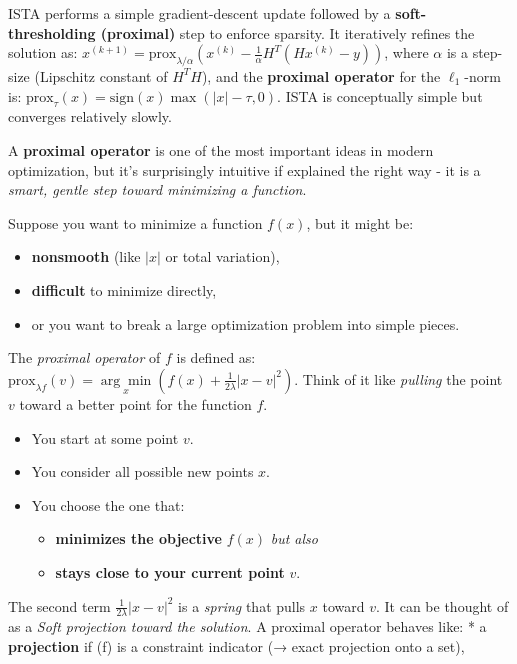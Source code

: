 \documentclass[11pt]{article}
\providecommand{\tightlist}{%
      \setlength{\itemsep}{0pt}\setlength{\parskip}{0pt}}
\begin{document}
ISTA performs a simple gradient-descent update followed by a
\textbf{soft-thresholding (proximal)} step to enforce sparsity. It
iteratively refines the solution as:
\(x^{(k+1)} = \text{prox}_{\lambda/\alpha} \left( x^{(k)} - \frac{1}{\alpha} H^T (Hx^{(k)}-y) \right)\),
where \(\alpha\) is a step-size (Lipschitz constant of \(H^T H\)), and
the \textbf{proximal operator} for the \(\ell_1\)-norm is:
\(\text{prox}_{\tau}(x) = \text{sign}(x)\max(|x| - \tau, 0)\). ISTA is
conceptually simple but converges relatively slowly.

A \textbf{proximal operator} is one of the most important ideas in
modern optimization, but it's surprisingly intuitive if explained the
right way - it is a \emph{smart, gentle step toward minimizing a
function}.

Suppose you want to minimize a function \(f(x)\), but it might be:

\begin{itemize}
\tightlist
\item
  \textbf{nonsmooth} (like \(|x|\) or total variation),
\item
  \textbf{difficult} to minimize directly,
\item
  or you want to break a large optimization problem into simple pieces.
\end{itemize}

The \emph{proximal operator} of \(f\) is defined as:
\(\text{prox}_{\lambda f}(v)= \underset{x}{\arg\min} \left( f(x) + \frac{1}{2\lambda}|x - v|^2 \right)\).
Think of it like \emph{pulling} the point \(v\) toward a better point
for the function \(f\).

\begin{itemize}
\tightlist
\item
  You start at some point \(v\).
\item
  You consider all possible new points \(x\).
\item
  You choose the one that:

  \begin{itemize}
  \tightlist
  \item
    \textbf{minimizes the objective} \(f(x)\) \emph{but also}
  \item
    \textbf{stays close to your current point} \(v\).
  \end{itemize}
\end{itemize}

The second term \(\frac{1}{2\lambda}|x-v|^2\) is a \emph{spring} that
pulls \(x\) toward \(v\). It can be thought of as a \emph{Soft
projection toward the solution}. A proximal operator behaves like: * a
\textbf{projection} if (f) is a constraint indicator (→ exact projection
onto a set),
\end{document}

